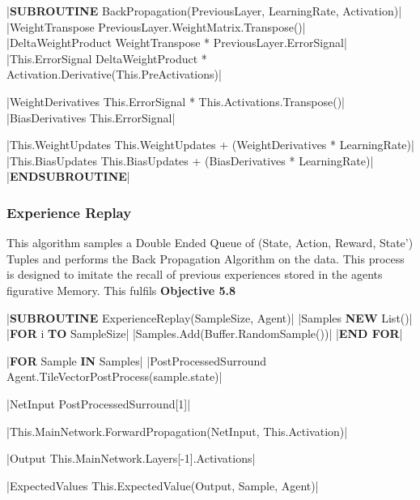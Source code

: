 \begin{flushleft}
                \vspace{0.2cm}
                \begin{pseudocode}
|\textbf{SUBROUTINE} BackPropagation(PreviousLayer, LearningRate, Activation)|
    |WeightTranspose \leftarrow PreviousLayer.WeightMatrix.Transpose()|
    |DeltaWeightProduct \leftarrow WeightTranspose * PreviousLayer.ErrorSignal|
    |This.ErrorSignal \leftarrow DeltaWeightProduct * Activation.Derivative(This.PreActivations)|

    |WeightDerivatives \leftarrow This.ErrorSignal * This.Activations.Transpose()|
    |BiasDerivatives \leftarrow This.ErrorSignal|

    |This.WeightUpdates \leftarrow This.WeightUpdates + (WeightDerivatives * LearningRate)|
    |This.BiasUpdates \leftarrow This.BiasUpdates + (BiasDerivatives * LearningRate)|
|\textbf{ENDSUBROUTINE}|
                \end{pseudocode}

                \vspace{0.5cm}
            \subsubsection{Experience Replay}
                This algorithm samples a Double Ended Queue of (State, Action, Reward, State') Tuples and performs the Back Propagation Algorithm
                on the data. This process is designed to imitate the recall of previous experiences stored in the agents figurative Memory. This 
                fulfils \textbf{Objective 5.8}

                \vspace{0.2cm}
                \begin{pseudocode}
|\textbf{SUBROUTINE} ExperienceReplay(SampleSize, Agent)|
    |Samples \leftarrow \textbf{NEW} List()|
    |\textbf{FOR} i  \textbf{TO} SampleSize|
        |Samples.Add(Buffer.RandomSample())|
    |\textbf{END FOR}|

    |\textbf{FOR} Sample \textbf{IN} Samples|
        |PostProcessedSurround \leftarrow Agent.TileVectorPostProcess(sample.state)|

        |NetInput \leftarrow PostProcessedSurround[1]|

        |This.MainNetwork.ForwardPropagation(NetInput, This.Activation)|

        |Output \leftarrow This.MainNetwork.Layers[-1].Activations|

        |ExpectedValues \leftarrow This.ExpectedValue(Output, Sample, Agent)|


\end{pseudocode}
\end{flushleft}

